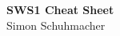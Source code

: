 \begin{titlepage}
    \begin{center}
        \null
        \vfill
            \begin{huge}
                \textbf{SWS1 Cheat Sheet}\\
                \vspace{5mm}
                Simon Schuhmacher
            \end{huge}
       \vfill
    \end{center}
\end{titlepage}
